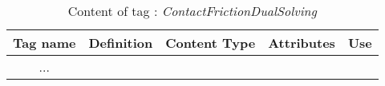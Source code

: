 \begin{table}[!hbp]
\begin{center}
\begin{tabular}{|c|p{4cm}|p{2cm}|p{5cm}|p{2cm}|}
\hline
\bf{Tag name} & \bf{Definition} & \bf{Content Type} & \bf{Attributes} & \bf{Use}
\\\hline
\hline
... &  &  &  &  \\
\hline
\end{tabular}
\end{center}
\caption{Content of tag : \textit{ContactFrictionDualSolving}}
\label{tab-CFDSolvingTag}
\end{table}

